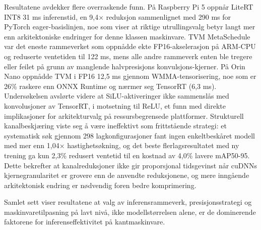 \documentclass[12pt,a4paper]{report}
\begin{document}
\begin{otherlanguage}{norwegian}
Resultatene avdekker flere overraskende
funn. På Raspberry Pi 5 oppnår LiteRT INT8 31 ms inferenstid, en 9,4× reduksjon
sammenlignet med 290 ms for PyTorch eager-basislinjen, noe som viser at riktige
utrullingsvalg betyr langt mer enn arkitektoniske endringer for denne klassen
maskinvare. TVM MetaSchedule var det eneste rammeverket som oppnådde ekte
FP16-akselerasjon på ARM-CPU og reduserte ventetiden til 122 ms, mens alle
andre rammeverk enten ble tregere eller feilet på grunn av manglende
halvpresisjons konvulsjons-kjerner. På Orin Nano oppnådde TVM i FP16 12,5 ms
gjennom WMMA-tensorisering, noe som er 26\% raskere enn ONNX Runtime og nærmer
seg TensorRT (6,3 ms). Undersøkelsen avslørte videre at SiLU-aktiveringer ikke
sammenslås med konvolusjoner av TensorRT, i motsetning til ReLU, et funn med
direkte implikasjoner for arkitekturvalg på ressursbegrensede plattformer.
Strukturell kanalbeskjæring viste seg å være ineffektivt som frittstående
strategi: et systematisk søk gjennom 298 lagkonfigurasjoner fant ingen
enkeltbeskåret modell med mer enn 1,04× hastighetsøkning, og det beste
flerlagsresultatet med ny trening ga kun 2,3\% redusert ventetid til en kostnad
av 4,0\% lavere mAP50-95. Dette bekrefter at kanalreduksjoner ikke gir proporsjonal tidsgevinst når cuDNNs
kjernegranularitet er grovere enn de
anvendte reduksjonene, og mere inngående arkitektonisk endring er nødvendig foren bedre komprimering.

Samlet sett viser resultatene at valg av inferensrammeverk, presisjonsstrategi og maskinvaretilpasning på lavt nivå,
ikke modellstørrelsen alene, er de dominerende faktorene for inferenseffektivitet på kantmaskinvare.

\end{otherlanguage}

\cleardoublepage
\begin{otherlanguage}{english}
    \tableofcontents
    \cleardoublepage
\end{otherlanguage}

\end{document}
